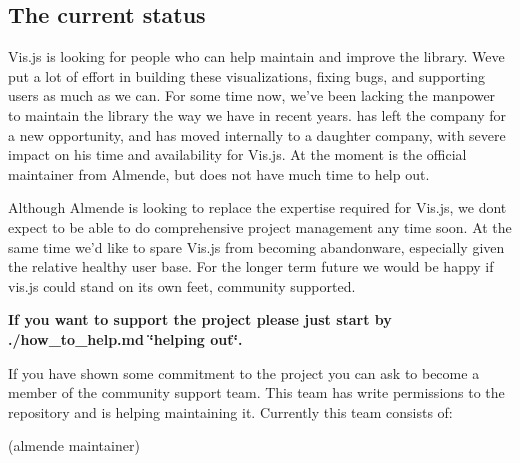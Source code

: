 \subsection*{The current status}

Vis.\+js is looking for people who can help maintain and improve the library. We\textquotesingle{}ve put a lot of effort in building these visualizations, fixing bugs, and supporting users as much as we can. For some time now, we’ve been lacking the manpower to maintain the library the way we have in recent years. \href{//github.com/josdejong}{\tt } has left the company for a new opportunity, and \href{//github.com/AlexDM0}{\tt } has moved internally to a daughter company, with severe impact on his time and availability for Vis.\+js. At the moment \href{//github.com/ludost}{\tt } is the official maintainer from Almende, but does not have much time to help out.

Although Almende is looking to replace the expertise required for Vis.\+js, we don\textquotesingle{}t expect to be able to do comprehensive project management any time soon. At the same time we’d like to spare Vis.\+js from becoming abandonware, especially given the relative healthy user base. For the longer term future we would be happy if vis.\+js could stand on its own feet, community supported.

{\bfseries If you want to support the project please just start by ./how\+\_\+to\+\_\+help.md \char`\"{}helping out\char`\"{}.}

If you have shown some commitment to the project you can ask \href{//github.com/ludost}{\tt } to become a member of the community support team. This team has write permissions to the repository and is helping maintaining it. Currently this team consists of\+:


\begin{DoxyItemize}
\item \href{//github.com/ludost}{\tt } (almende maintainer)
\item \href{//github.com/mojoaxel}{\tt }
\item \href{//github.com/yotamberk}{\tt } 
\end{DoxyItemize}